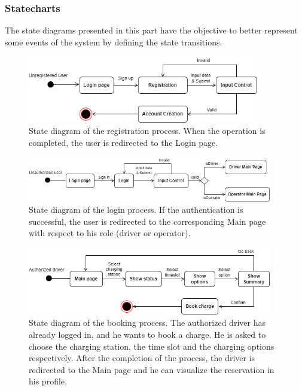 \documentclass[../main.tex]{subfiles}
\begin{document}
\subsubsection{Statecharts}
The state diagrams presented in this part have the objective to better represent some events of the system by defining the state transitions. 

\begin{figure}[H]
    \centering
    \includegraphics[width=0.9\textwidth]{statecharts/sc_register.png}
    \caption{State diagram of the registration process. When the operation is completed, the user is redirected to the Login page.}
    \label{fig:register}
\end{figure}

\begin{figure}[H]
    \centering
    \includegraphics[width=0.95\textwidth]{statecharts/sc_login.png}
    \caption{State diagram of the login process. If the authentication is successful, the user is redirected to the corresponding Main page with respect to his role (driver or operator). }
    \label{fig:login}
\end{figure}

\begin{figure}[H]
    \centering
    \includegraphics[width=0.95\textwidth]{statecharts/sc_bookCharge.png}
    \caption{State diagram of the booking process. The authorized driver has already logged in, and he wants to book a charge. He is asked to choose the charging station, the time slot and the charging options respectively. After the completion of the process, the driver is redirected to the Main page and he can visualize the reservation in his profile.}
    \label{fig:bookCharge}
\end{figure}
\end{document}
